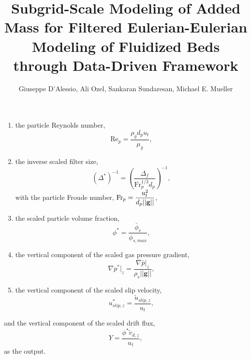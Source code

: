 \documentclass[11pt]{article}
\title{Subgrid-Scale Modeling of Added Mass for Filtered Eulerian-Eulerian Modeling of Fluidized Beds through Data-Driven Framework}
\author{
Giuseppe D'Alessio,
Ali Ozel,
Sankaran Sundaresan,
Michael E. Mueller
}
\newcommand{\grav}{\mathbf{g}}
\newcommand{\uSlipz}{\tilde{u}_{slip,z}}
\newcommand{\uSlipStar}{u_{slip,z}^{*}}
\newcommand{\Rep}{\text{Re}_p}
\newcommand{\Frp}{\text{Fr}_p}
\newcommand{\gradPgStar}{\nabla p^{*}|_z}
\begin{document}
\maketitle

\newpage

\begin{enumerate}[label=(\roman*), labelsep=.5em, leftmargin=2\parindent]
    \item the particle Reynolds number, 
        \begin{equation}\label{Rep}
            \Rep = \frac{\rho_{g}d_{p}u_{t}}{\mu_g},
        \end{equation}    
    \item the inverse scaled filter size,
        \begin{equation}\label{invDelta}        
            (\Delta^{*})^{-1} = \left( \frac{\Delta_{f}}{\Frp^{1/3}d_{p}} \right)^{-1},
        \end{equation} 
        with the particle Froude number, $\mathlarger{\Frp = \frac{u_{t}^{2}}{d_{p}||\grav||}}$\label{Frp},
    \item the scaled particle volume fraction, 
        \begin{equation}\label{phiStar}   
            \phi^{*} = \frac{\bar{\phi}_{s}}{\phi_{s,max}},
        \end{equation}    
    \item the vertical component of the scaled gas pressure gradient, 
        \begin{equation}\label{gradPhStar}           
            \gradPgStar = \frac{\nabla \bar{p}|_{z}}{\rho_{s}||\grav||},
        \end{equation}    
    \item the vertical component of the scaled slip velocity, 
        \begin{equation}\label{uSlipStar}      
            \uSlipStar = \frac{\uSlipz}{u_{t}},
        \end{equation}    
\end{enumerate} 
and the vertical component of the scaled drift flux, 
        \begin{equation}\label{Y}      
            Y = \frac{\phi^{*}\tilde{v}_{d,z}}{u_t},
        \end{equation}  
as the output.
\end{document}

